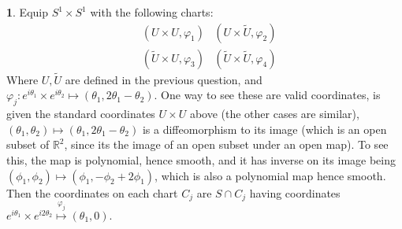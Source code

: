 \documentclass[10.5pt]{article}
\theoremstyle{definition}
\newtheorem{pb}{}
\newcommand{\vp}{\varphi}
\begin{document}
    \begin{pb}
        Equip \(S^1 \times S^1\) with the following charts:
        \begin{align*}
            &(U \times U, \vp_1) &(U \times \tilde{U}, \vp_2) \\
            &(\tilde{U} \times U, \vp_3) &(\tilde{U} \times \tilde{U}, \vp_4)
        \end{align*}
        Where \(U, \tilde{U}\) are defined in the previous question, and \(\vp_j: e^{i\theta_1} \times e^{i\theta_2} \mapsto (\theta_1,2\theta_1 - \theta_2)\).
        One way to see these are valid coordinates, is given the standard coordinates \(U \times U\) above (the other cases are similar), \((\theta_1,\theta_2) \mapsto (\theta_1,2\theta_1 - \theta_2)\)
        is a diffeomorphism to its image (which is an open subset of \(\mathbb{R}^2\), since its the image of an open subset under an open map). To see this,
        the map is polynomial, hence smooth, and it has inverse on its image being \((\phi_1,\phi_2) \mapsto (\phi_1, -\phi_2 + 2\phi_1)\), which is also a polynomial map
        hence smooth.
        Then the coordinates on each chart \(C_j\) are \(S \cap C_j\) having coordinates \(e^{i\theta_1} \times e^{i2\theta_2} \overset{\vp_j}{\mapsto} (\theta_1,0)\).
    \end{pb}
\end{document}

